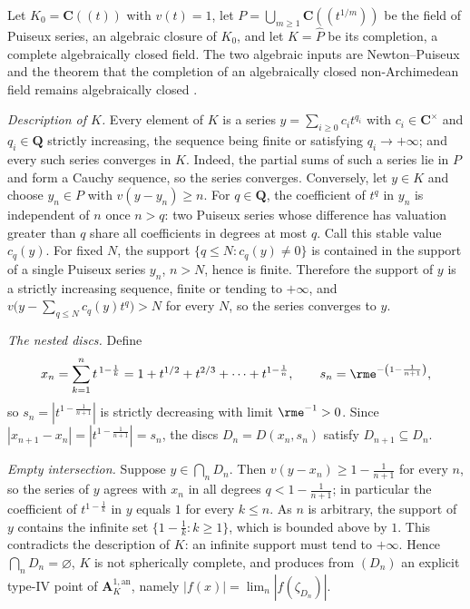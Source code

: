 \begin{example}
\label{ex:berk-type4-puiseux}
Let $K_0=\mathbf C(\!(t)\!)$ with $v(t)=1$, let
$P=\bigcup_{m\geq1}\mathbf C(\!(t^{1/m})\!)$ be the field of Puiseux
series, an algebraic closure of $K_0$, and let $K=\widehat P$ be its
completion, a complete algebraically closed field.  The two algebraic
inputs are Newton--Puiseux
\cite[Theorem~A.18]{Sambale2023} and the theorem that the completion of
an algebraically closed non-Archimedean field remains algebraically
closed \cite[Proposition~3.4.1/3]{BGR84}.

\emph{Description of $K$.}  Every element of $K$ is a series
$y=\sum_{i\geq0}c_it^{q_i}$ with $c_i\in\mathbf C^\times$ and
$q_i\in\mathbf Q$ strictly increasing, the sequence being finite or
satisfying $q_i\to+\infty$; and every such series converges in
$K$.  Indeed, the partial sums of such a series lie in $P$ and form
a Cauchy sequence, so the series converges.  Conversely, let
$y\in K$ and choose $y_n\in P$ with $v(y-y_n)\geq n$.  For
$q\in\mathbf Q$, the coefficient of $t^q$ in $y_n$ is independent
of $n$ once $n>q$: two Puiseux series whose difference has
valuation greater than $q$ share all coefficients in degrees at most
$q$.  Call this stable value $c_q(y)$.  For fixed $N$, the
support $\{q\leq N:c_q(y)\neq0\}$ is contained in the support of a
single Puiseux series $y_n$, $n>N$, hence is finite.  Therefore
the support of $y$ is a strictly increasing sequence, finite or
tending to $+\infty$, and
$v\bigl(y-\sum_{q\leq N}c_q(y)t^q\bigr)>N$ for every $N$, so the
series converges to $y$.

\emph{The nested discs.}  Define
\[
 x_n=\sum_{k=1}^{n}t^{\,1-\frac1k}
 =1+t^{1/2}+t^{2/3}+\cdots+t^{1-\frac1n},
 \qquad
 s_n=\rme^{-\left(1-\frac1{n+1}\right)},
\]
so $s_n=|t^{1-\frac1{n+1}}|$ is strictly decreasing with limit
$\rme^{-1}>0$.  Since $|x_{n+1}-x_n|=|t^{1-\frac1{n+1}}|=s_n$, the
discs $D_n=D(x_n,s_n)$ satisfy $D_{n+1}\subseteq D_n$.

\emph{Empty intersection.}  Suppose $y\in\bigcap_nD_n$.  Then
$v(y-x_n)\geq1-\frac1{n+1}$ for every $n$, so the series of $y$
agrees with $x_n$ in all degrees $q<1-\frac1{n+1}$; in particular
the coefficient of $t^{1-\frac1k}$ in $y$ equals $1$ for every
$k\leq n$.  As $n$ is arbitrary, the support of $y$ contains the
infinite set $\{1-\frac1k:k\geq1\}$, which is bounded above by $1$.
This contradicts the description of $K$: an infinite support must
tend to $+\infty$.  Hence $\bigcap_nD_n=\varnothing$, $K$ is not
spherically complete, and  produces
from $(D_n)$ an explicit type-IV point of
$\mathbf A^{1,\mathrm{an}}_K$, namely
$|f(x)|=\lim_n|f(\zeta_{D_n})|$.
\end{example}

